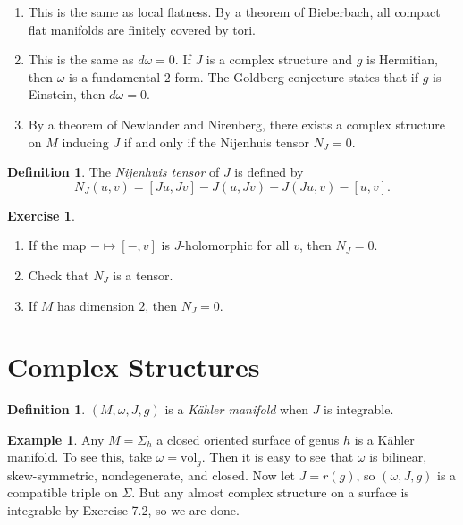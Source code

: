\documentclass[leqno, openany]{memoir}
\theoremstyle{definition}
\newtheorem{defn}[thm]{Definition}
\newtheorem{exm}[thm]{Example}
\newtheorem{exer}[thm]{Exercise}
\theoremstyle{remark}
\theoremstyle{plain}
\theoremstyle{definition}
\theoremstyle{remark}
\newcommand{\mr}[1]{\mathrm{#1}}
\begin{document}
\begin{enumerate}
    \item This is the same as local flatness. By a theorem of Bieberbach, all compact flat manifolds are finitely covered by tori.
    \item This is the same as $d\omega = 0$. If $J$ is a complex structure and $g$ is Hermitian, then $\omega$ is a fundamental $2$-form. The Goldberg conjecture states that if $g$ is Einstein, then $d\omega = 0$.
    \item By a theorem of Newlander and Nirenberg, there exists a complex structure on $M$ inducing $J$ if and only if the Nijenhuis tensor $N_J = 0$.
\end{enumerate}

\begin{defn}
    The \textit{Nijenhuis tensor} of $J$ is defined by
    \[ N_J(u, v) = [Ju, Jv] - J(u, Jv) - J(Ju, v) - [u, v]. \]
\end{defn}

\begin{exer}
    \begin{enumerate}
        \item If the map $- \mapsto [-, v]$ is $J$-holomorphic for all $v$, then $N_J = 0$.
        \item Check that $N_J$ is a tensor.
        \item If $M$ has dimension $2$, then $N_J = 0$.
    \end{enumerate}
\end{exer}

\section{Complex Structures}%
\label{sec:complex_structures}

\begin{defn}
    $(M, \omega, J, g)$ is a \textit{K\"ahler manifold} when $J$ is integrable.
\end{defn}

\begin{exm}
    Any $M = \Sigma_h$ a closed oriented surface of genus $h$ is a K\"ahler manifold. To see this, take $\omega = \mr{vol}_g$. Then it is easy to see that $\omega$ is bilinear, skew-symmetric, nondegenerate, and closed. Now let $J = r(g)$, so $(\omega, J, g)$ is a compatible triple on $\Sigma$. But any almost complex structure on a surface is integrable by Exercise 7.2, so we are done.
\end{exm}
\end{document}
